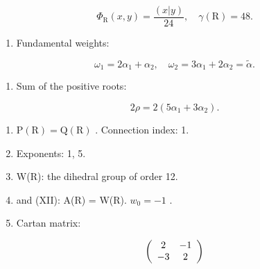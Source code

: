 \[
  \Phi_ {\mathrm{R}} (x, y) = \frac {(x | y)}{24}, \quad \gamma (\mathrm{R}) = 48.
\]

\begin{enumerate}
\def\labelenumi{(\Roman{enumi})}
\setcounter{enumi}{5}
\tightlist
\item
  Fundamental weights:
\end{enumerate}

\[
\omega_ {1} = 2 \alpha_ {1} + \alpha_ {2}, \quad \omega_ {2} = 3 \alpha_ {1} + 2 \alpha_ {2} = \tilde {\alpha}.
\]

\begin{enumerate}
\def\labelenumi{(\Roman{enumi})}
\setcounter{enumi}{6}
\tightlist
\item
  Sum of the positive roots:
\end{enumerate}

\[
2 \rho = 2 (5 \alpha_ {1} + 3 \alpha_ {2}).
\]

\begin{enumerate}
\def\labelenumi{(\Roman{enumi})}
\setcounter{enumi}{7}
\item
  \(\mathrm{P}(\mathrm{R}) = \mathrm{Q}(\mathrm{R})\) . Connection index: 1.
\item
  Exponents: 1, 5.
\item
  W(R): the dihedral group of order 12.
\item
  and (XII): A(R) = W(R). \(w_{0} = -1\) .
\item
  Cartan matrix:
\end{enumerate}

\[
\left( \begin{array}{c c} 2 & - 1 \\ - 3 & 2 \end{array} \right)
\]

